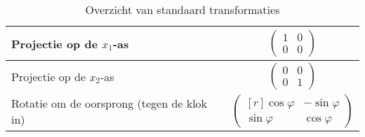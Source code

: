 \begin{table}[h]
\begin{tabular}{l|c}
		Projectie op de $x_1$-as & $\begin{pmatrix} 1 & 0 \\ 0 & 0 \end{pmatrix}$ \\ \hline
		Projectie op de $x_2$-as & $\begin{pmatrix} 0 & 0 \\ 0 & 1 \end{pmatrix}$ \\  \hline
		Rotatie om de oorsprong (tegen de klok in) & $\begin{pmatrix*}[r] \cos \varphi & - \sin \varphi \\	\sin \varphi & \cos \varphi \end{pmatrix*}$
	\end{tabular}
	\caption{Overzicht van standaard transformaties}
	\label{tbl:standtrans}
\end{table}